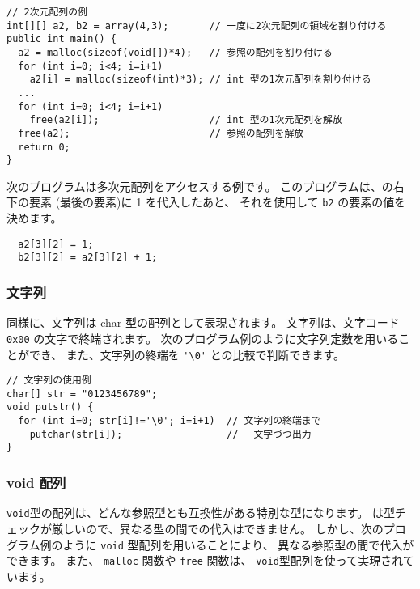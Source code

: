 
\begin{mylist}
\begin{verbatim}
// 2次元配列の例
int[][] a2, b2 = array(4,3);       // 一度に2次元配列の領域を割り付ける
public int main() {
  a2 = malloc(sizeof(void[])*4);   // 参照の配列を割り付ける
  for (int i=0; i<4; i=i+1)
    a2[i] = malloc(sizeof(int)*3); // int 型の1次元配列を割り付ける
  ...
  for (int i=0; i<4; i=i+1)
    free(a2[i]);                   // int 型の1次元配列を解放
  free(a2);                        // 参照の配列を解放
  return 0;
}
\end{verbatim}
\end{mylist}

次のプログラムは多次元配列をアクセスする例です。
このプログラムは、の右下の要素
(最後の要素)に 1 を代入したあと、
それを使用して \verb/b2/ の要素の値を決めます。

\begin{mylist}
\begin{verbatim}
  a2[3][2] = 1;
  b2[3][2] = a2[3][2] + 1;
\end{verbatim}
\end{mylist}

\subsubsection{文字列}

\cl 同様に、文字列は char 型の配列として表現されます。
文字列は、文字コード \verb/0x00/ の文字で終端されます。
次のプログラム例のように文字列定数を用いることができ、
また、文字列の終端を \verb/'\0'/ との比較で判断できます。

\begin{mylist}
\begin{verbatim}
// 文字列の使用例
char[] str = "0123456789";
void putstr() {
  for (int i=0; str[i]!='\0'; i=i+1)  // 文字列の終端まで
    putchar(str[i]);                  // 一文字づつ出力
}
\end{verbatim}
\end{mylist}

\subsubsection{ void 配列}

\verb/void/型の配列は、どんな参照型とも互換性がある特別な型になります。
\cmml は型チェックが厳しいので、異なる型の間での代入はできません。
しかし、次のプログラム例のように \verb/void/ 型配列を用いることにより、
異なる参照型の間で代入ができます。
また、 \verb/malloc/ 関数や \verb/free/ 関数は、
\verb/void/型配列を使って実現されています。

